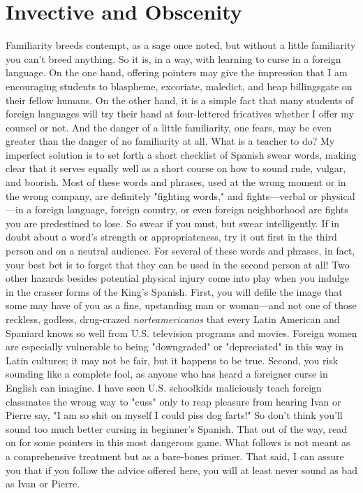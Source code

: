 \chapter{Invective and Obscenity}

Familiarity breeds contempt, as a sage once noted, but without
a little familiarity you can't breed anything. So it is, in a way, with
learning to curse in a foreign language. On the one hand, offering pointers may give the impression that I am encouraging students to blaspheme, excoriate, maledict, and heap billingsgate on their fellow humans. On the other hand, it is a simple fact that many students of
foreign languages will try their hand at four-lettered fricatives whether
I offer my counsel or not. And the danger of a little familiarity, one
fears, may be even greater than the danger of no familiarity at all. What
is a teacher to do?
My imperfect solution is to set forth a short checklist of Spanish swear words, making clear that it serves equally well as a short
course on how to sound rude, vulgar, and boorish. Most of these words
and phrases, used at the wrong moment or in the wrong company, are
definitely "fighting words," and fights---verbal or physical---in a foreign language, foreign country, or even foreign neighborhood are fights
you are predestined to lose. So swear if you must, but swear intelligently. If in doubt about a word's strength or appropriateness, try it out
first in the third person and on a neutral audience. For several of these
words and phrases, in fact, your best bet is to forget that they can be
used in the second person at all!
Two other hazards besides potential physical injury come into
play when you indulge in the crasser forms of the King's Spanish. First,
you will defile the image that some may have of you as a fine, upstanding man or woman---and not one of those reckless, godless, drug-crazed
\emph{norteamericanos} that every Latin American and Spaniard knows so
well from U.S. television programs and movies. Foreign women are especially vulnerable to being "downgraded" or "depreciated" in this
way in Latin cultures; it may not be fair, but it happens to be true.
Second, you risk sounding like a complete fool, as anyone who
has heard a foreigner curse in English can imagine. I have seen U.S.
schoolkids maliciously teach foreign classmates the wrong way to
"cuss" only to reap pleasure from hearing Ivan or Pierre say, "I am so
shit on myself I could piss dog farts!" So don't think you'll sound too
much better cursing in beginner's Spanish. That out of the way, read
on for some pointers in this most dangerous game. What follows is not
meant as a comprehensive treatment but as a bare-bones primer. That
said, I can assure you that if you follow the advice offered here, you
will at least never sound as bad as Ivan or Pierre.


